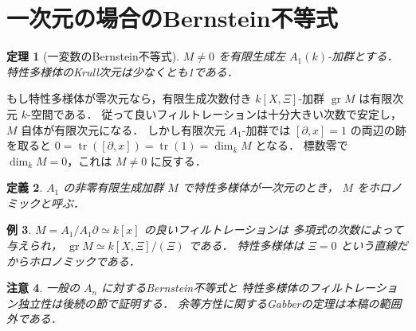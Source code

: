 \documentclass[a5paper,10pt,onecolumn]{jsarticle}
\makeatletter
\theoremstyle{mathnotetheorem}
\newtheorem{theorem}{定理}[section]
\newtheorem{definition}[theorem]{定義}
\newtheorem{example}[theorem]{例}
\newtheorem{remark}[theorem]{注意}
\renewcommand{\proofname}{証明}
\renewenvironment{proof}[1][\proofname]{%
  \par\pushQED{\qed}\normalfont\topsep4\p@\@plus2\p@\relax
  \trivlist\item[\hskip\labelsep\bfseries #1]\ignorespaces
}{\popQED\endtrivlist\@endpefalse}
\makeatother
\begin{document}
\section{一次元の場合のBernstein不等式}
\begin{theorem}[一変数のBernstein不等式]
$M\ne0$ を有限生成左 $A_1(k)$-加群とする．
特性多様体のKrull次元は少なくとも1である．
\end{theorem}
\begin{proof}
もし特性多様体が零次元なら，有限生成次数付き
$k[X,\Xi]$-加群 $\operatorname{gr}M$ は有限次元 $k$-空間である．
従って良いフィルトレーションは十分大きい次数で安定し，
$M$ 自体が有限次元になる．
しかし有限次元 $A_1$-加群では
$[\partial,x]=1$ の両辺の跡を取ると
$0=\operatorname{tr}([\partial,x])=\operatorname{tr}(1)=\dim_k M$ となる．
標数零で $\dim_k M=0$，これは $M\ne0$ に反する．
\end{proof}
\begin{definition}
$A_1$ の非零有限生成加群 $M$ で特性多様体が一次元のとき，
$M$ をホロノミックと呼ぶ．
\end{definition}
\begin{example}
$M=A_1/A_1\partial\simeq k[x]$ の良いフィルトレーションは
多項式の次数によって与えられ，
$\operatorname{gr}M\simeq k[X,\Xi]/(\Xi)$ である．
特性多様体は $\Xi=0$ という直線だからホロノミックである．
\end{example}
\begin{remark}
一般の $A_n$ に対するBernstein不等式と
特性多様体のフィルトレーション独立性は後続の節で証明する．
余等方性に関するGabberの定理は本稿の範囲外である．
\end{remark}
\end{document}
